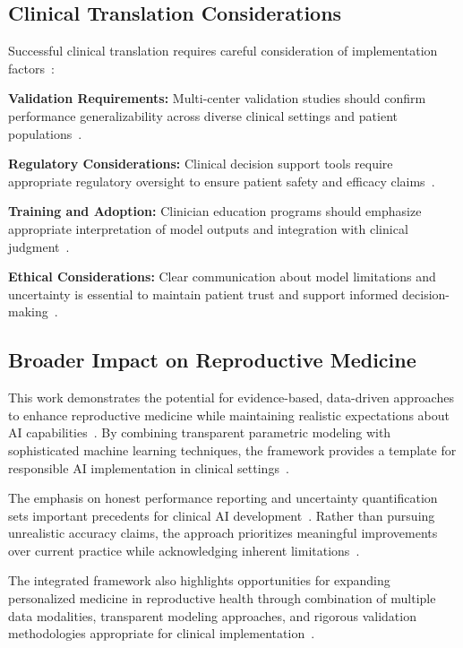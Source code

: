 \subsection{Clinical Translation Considerations}

Successful clinical translation requires careful consideration of implementation factors~\cite{fda2022clinical,rajkomar2019machine}:

\textbf{Validation Requirements:} Multi-center validation studies should confirm performance generalizability across diverse clinical settings and patient populations~\cite{varoquaux2022machine}.

\textbf{Regulatory Considerations:} Clinical decision support tools require appropriate regulatory oversight to ensure patient safety and efficacy claims~\cite{fda2021ai,fda2022clinical}.

\textbf{Training and Adoption:} Clinician education programs should emphasize appropriate interpretation of model outputs and integration with clinical judgment~\cite{topol2019high}.

\textbf{Ethical Considerations:} Clear communication about model limitations and uncertainty is essential to maintain patient trust and support informed decision-making~\cite{beauchamp2019principles}.

\subsection{Broader Impact on Reproductive Medicine}

This work demonstrates the potential for evidence-based, data-driven approaches to enhance reproductive medicine while maintaining realistic expectations about AI capabilities~\cite{topol2019high}. By combining transparent parametric modeling with sophisticated machine learning techniques, the framework provides a template for responsible AI implementation in clinical settings~\cite{rudin2019stop}.

The emphasis on honest performance reporting and uncertainty quantification sets important precedents for clinical AI development~\cite{varoquaux2022machine}. Rather than pursuing unrealistic accuracy claims, the approach prioritizes meaningful improvements over current practice while acknowledging inherent limitations~\cite{rajkomar2019machine}.

The integrated framework also highlights opportunities for expanding personalized medicine in reproductive health through combination of multiple data modalities, transparent modeling approaches, and rigorous validation methodologies appropriate for clinical implementation~\cite{li2020federated,topol2019high}. 